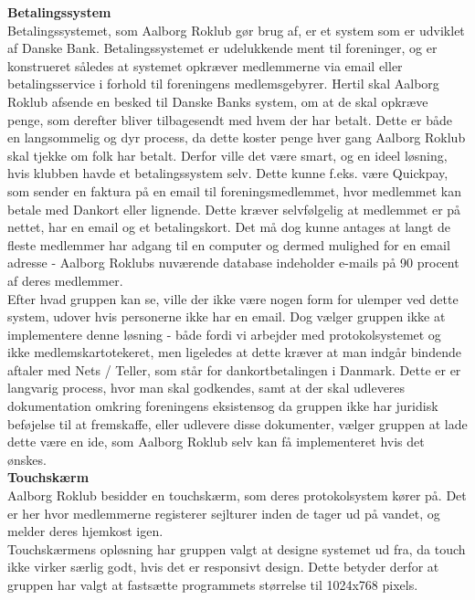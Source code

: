\textbf{Betalingssystem}\\
Betalingssystemet, som Aalborg Roklub gør brug af, er et system som er udviklet af Danske Bank. Betalingssystemet er udelukkende ment til foreninger, og er konstrueret således at systemet opkræver medlemmerne via email eller betalingsservice i forhold til foreningens medlemsgebyrer. Hertil skal Aalborg Roklub afsende en besked til Danske Banks system, om at de skal opkræve penge, som derefter bliver tilbagesendt med hvem der har betalt. Dette er både en langsommelig og dyr process, da dette koster penge hver gang Aalborg Roklub skal tjekke om folk har betalt. 
Derfor ville det være smart, og en ideel løsning, hvis klubben havde et betalingssystem selv. Dette kunne f.eks. være Quickpay, som sender en faktura på en email til foreningsmedlemmet, hvor medlemmet kan betale med Dankort eller lignende. Dette kræver selvfølgelig at medlemmet er på nettet, har en email og et betalingskort. Det må dog kunne antages at langt de fleste medlemmer har adgang til en computer og dermed mulighed for en email adresse - Aalborg Roklubs nuværende database indeholder e-mails på 90 procent af deres medlemmer.\\

Efter hvad gruppen kan se, ville der ikke være nogen form for ulemper ved dette system, udover hvis personerne ikke har en email. Dog vælger gruppen ikke at implementere denne løsning - både fordi vi arbejder med protokolsystemet og ikke medlemskartotekeret, men ligeledes at dette kræver at man indgår bindende aftaler med Nets / Teller, som står for dankortbetalingen i Danmark. Dette er er langvarig process, hvor man skal godkendes, samt at der skal udleveres dokumentation omkring foreningens eksistensog da gruppen ikke har juridisk beføjelse til at fremskaffe, eller udlevere disse dokumenter, vælger gruppen at lade dette være en ide, som Aalborg Roklub selv kan få implementeret hvis det ønskes.\\

\textbf{Touchskærm}\\
Aalborg Roklub besidder en touchskærm, som deres protokolsystem kører på. Det er her hvor medlemmerne registerer sejlturer inden de tager ud på vandet, og melder deres hjemkost igen.\\
Touchskærmens opløsning har gruppen valgt at designe systemet ud fra, da touch ikke virker særlig godt, hvis det er responsivt design. Dette betyder derfor at gruppen har valgt at fastsætte programmets størrelse til 1024x768 pixels.\\

